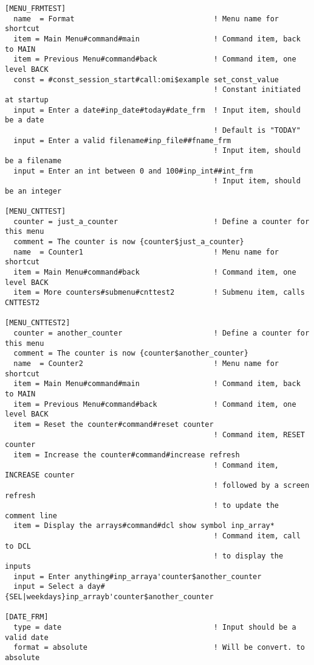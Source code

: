 \documentclass[a4paper]{book}
\begin{document}
\begin{verbatim}
[MENU_FRMTEST]
  name  = Format                                ! Menu name for shortcut
  item = Main Menu#command#main                 ! Command item, back to MAIN
  item = Previous Menu#command#back             ! Command item, one level BACK
  const = #const_session_start#call:omi$example set_const_value
                                                ! Constant initiated at startup
  input = Enter a date#inp_date#today#date_frm  ! Input item, should be a date
                                                ! Default is "TODAY"
  input = Enter a valid filename#inp_file##fname_frm
                                                ! Input item, should be a filename
  input = Enter an int between 0 and 100#inp_int##int_frm
                                                ! Input item, should be an integer

[MENU_CNTTEST]
  counter = just_a_counter                      ! Define a counter for this menu
  comment = The counter is now {counter$just_a_counter}
  name  = Counter1                              ! Menu name for shortcut
  item = Main Menu#command#back                 ! Command item, one level BACK
  item = More counters#submenu#cnttest2         ! Submenu item, calls CNTTEST2

[MENU_CNTTEST2]
  counter = another_counter                     ! Define a counter for this menu
  comment = The counter is now {counter$another_counter}
  name  = Counter2                              ! Menu name for shortcut
  item = Main Menu#command#main                 ! Command item, back to MAIN
  item = Previous Menu#command#back             ! Command item, one level BACK
  item = Reset the counter#command#reset counter
                                                ! Command item, RESET counter
  item = Increase the counter#command#increase refresh
                                                ! Command item, INCREASE counter
                                                ! followed by a screen refresh
                                                ! to update the comment line
  item = Display the arrays#command#dcl show symbol inp_array*
                                                ! Command item, call to DCL
                                                ! to display the inputs
  input = Enter anything#inp_arraya'counter$another_counter
  input = Select a day#{SEL|weekdays}inp_arrayb'counter$another_counter

[DATE_FRM]
  type = date                                   ! Input should be a valid date
  format = absolute                             ! Will be convert. to absolute


\end{verbatim}
\end{document}
